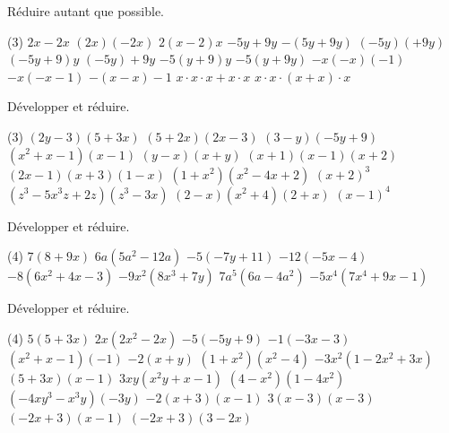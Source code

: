 \documentclass[a4paper,12pt]{report}
\begin{document}
\begin{exo}
Réduire autant que possible.
\begin{tasks}(3)
\task $2 x-2 x$
\task $(2 x)(-2 x)$
\task $2(x-2) x$
\task $-5 y+9 y$
\task $-(5 y+9 y)$
\task $(-5 y)(+9 y)$
\task $(-5 y+9) y$
\task $(-5 y)+9 y$
\task $-5(y+9) y$
\task $-5(y+9 y)$
\task $-x(-x)(-1)$
\task $-x(-x-1)$
\task $-(x-x)-1$
\task $x \cdot x \cdot x+x \cdot x$
\task $x \cdot x \cdot(x+x) \cdot x$
\end{tasks}
\end{exo}
\begin{exo}
Développer et réduire.
\begin{tasks}(3)
\task $(2 y-3)(5+3 x)$
\task $(5+2 x)(2 x-3)$
\task $(3-y)(-5 y+9)$
\task $\left(x^2+x-1\right)(x-1)$
\task $(y-x)(x+y)$
\task $(x+1)(x-1)(x+2)$
\task $(2 x-1)(x+3)(1-x)$
\task $\left(1+x^2\right)\left(x^2-4 x+2\right)$
\task $(x+2)^3$
\task $\left(z^3-5 x^3 z+2 z\right)\left(z^3-3 x\right)$
\task $(2-x)\left(x^2+4\right)(2+x)$
\task $(x-1)^4$
\end{tasks}
\end{exo}


\begin{exo}
Développer et réduire.
\begin{tasks}(4)
\task $7(8+9 x)$
\task $6 a\left(5 a^2-12 a\right)$
\task $-5(-7 y+11)$
\task $-12(-5 x-4)$
\task $-8\left(6 x^2+4 x-3\right)$
\task $-9 x^2\left(8 x^3+7 y\right)$
\task $7 a^5\left(6 a-4 a^2\right)$
\task $-5 x^4\left(7 x^4+9 x-1\right)$
\end{tasks}
\end{exo}
\begin{exo}
Développer et réduire.
\begin{tasks}(4)
\task $5(5+3 x)$
\task $2 x\left(2 x^2-2 x\right)$
\task $-5(-5 y+9)$
\task $-1(-3 x-3)$
\task $\left(x^2+x-1\right)(-1)$
\task $-2(x+y)$
\task $\left(1+x^2\right)\left(x^2-4\right)$
\task $-3 x^2\left(1-2 x^2+3 x\right)$
\task $(5+3 x)(x-1)$
\task $3 x y\left(x^2 y+x-1\right)$
\task $\left(4-x^2\right)\left(1-4 x^2\right)$
\task $\left(-4 x y^3-x^3 y\right)(-3 y)$
\task $-2(x+3)(x-1)$
\task $3(x-3)(x-3)$
\task $(-2 x+3)(x-1)$
\task $(-2 x+3)(3-2 x)$
\end{tasks}
\end{exo}
\end{document}
